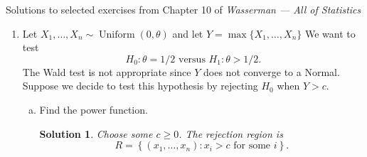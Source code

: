\documentclass[10pt]{article}
\newtheorem*{sol}{Solution}
\newcommand{\Unif}{\operatorname{Uniform}}
\begin{document}
\noindent \large{Solutions to selected exercises from Chapter 10 of
\emph{Wasserman --- All of Statistics}}

\begin{enumerate}
\item[(5)] Let $X_1,\ldots,X_n \sim \Unif(0,\theta)$ and let
$Y = \max\{X_1,\ldots,X_n\}$ We want to test
\[H_0 : \theta = 1/2 \text{ versus } H_1 : \theta > 1/2.\]
The Wald test is not appropriate since $Y$ does not converge to a Normal.
Suppose we decide to test this hypothesis by rejecting $H_0$ when $Y>c$.
\begin{enumerate}[(a)]
\item Find the power function.

\begin{sol}
Choose some $c \geq 0$. The rejection region is
\[
R = \left\{ (x_1,\ldots,x_n) : x_i > c \text{ for some } i\right\}.
\]


\end{sol}
\end{enumerate}
\end{enumerate}
\end{document}
